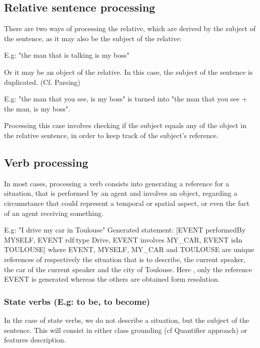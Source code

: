 \documentclass[twoside,a4paper,10pt]{report}
\newcommand{\dokutitleleveltree}[1]{\subsection{#1}}
\newcommand{\dokutitlelevelfour}[1]{\subsubsection{#1}}
\begin{document}
\dokutitleleveltree{Relative sentence processing}
\label{e453b97231b3979c4f8435dc7227a770}%
There are two ways of processing the relative, which are derived by the subject of the sentence, as it may also be the subject of the relative:


\small
\begin{verbatimtab}
  
  E.g: "the man that is talking is my boss"
  
\end{verbatimtab}
\normalsize

Or it may be an object of the relative. In this case, the subject of the sentence is duplicated. (Cf. Parsing)


\small
\begin{verbatimtab}
  
  E.g: "the man that you see, is my boss" is turned into "the man that you see + the man, is my
boss".
  
\end{verbatimtab}
\normalsize

Processing this case involves checking if the subject equals any of the object in the relative sentence, in order to keep track of the subject's reference.
 



\dokutitleleveltree{Verb processing}
\label{d579d8cc3406c0556913bbaac7ee85e6}%
In most cases, processing a verb consists into generating a reference for a situation, that is performed by an agent and involves an object, regarding a circumstance that could represent a temporal or spatial aspect, or even the fact of an agent receiving something.


\small
\begin{verbatimtab}
  
  E.g: "I drive my car in Toulouse"
  Generated statement:
      [EVENT performedBy MYSELF, EVENT rdf:type Drive, EVENT involves MY_CAR, EVENT isIn TOULOUSE]
  where EVENT, MYSELF, MY_CAR and TOULOUSE are unique references of respectively the situation that
is to describe, the current speaker, the car of the current speaker and the city of Toulouse.
  Here , only the reference EVENT is generated whereas the others are obtained form resolution.
  
      
\end{verbatimtab}
\normalsize

\dokutitlelevelfour{State verbs (E.g: to be, to become)}

In the case of state verbs, we do not describe a situation, but the subject of the sentence. This will consist in either class grounding (cf Quantifier approach) or features description.
\end{document}
